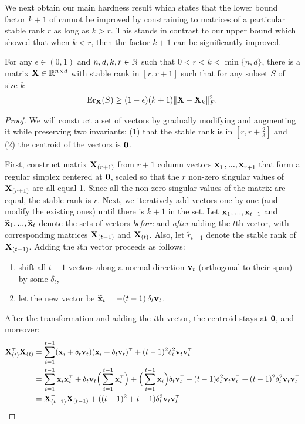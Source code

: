 \documentclass{article}
\begin{document}
We next obtain our main hardness result which states that the lower bound
factor $k+1$ of \cite{pca-volume-sampling} cannot be improved by constraining to matrices of a
particular stable rank $r$ as long as $k>r$. This stands in contrast
to our upper bound which showed that when $k<r$, then the factor $k+1$
can be significantly improved.
\begin{theorem}
	\label{t:lowerboundrleqk}
	For any $\epsilon\in(0,1)$ and $n,d,k,r\in\mathbb N$ such that  $0<r< k<\min\{n,d\}$, there is a matrix
	$\mathbf X\in\mathbb R^{n\times d}$ with stable rank in $[r,r+1]$ such that for any subset
	$S$ of size $k$
	\begin{align*}
	\mathrm{Er}_{\mathbf X}(S)\geq (1-\epsilon)(k+1) \|\mathbf X - \mathbf X_k \|_F^2.
	\end{align*}
\end{theorem}
\begin{proof}
	We will construct a set of vectors by gradually modifying and augmenting it while
	preserving two invariants: (1) that the stable rank is in $[r,r+\frac23]$
	and (2) the centroid of the vectors is  $\mathbf 0$. 
	
	First, construct matrix $\mathbf X_{(r+1)}$  from $r+1$ column vectors
	$\x_1^\top,...,\x_{r+1}^\top$ that form 
	a regular simplex centered at $\mathbf 0$, scaled so that the $r$ non-zero
	singular values of $\mathbf X_{(r+1)}$ are all equal 1. Since all the non-zero
	singular values of the matrix are equal, the stable rank
	is $r$. Next, we iteratively add vectors one by one (and modify the
	existing ones) until there is $k+1$ in the set. Let $\mathbf x_{1},...,\mathbf x_{t-1}$ and
	$\widetilde{\mathbf x}_1,...,\widetilde{\mathbf x}_t$ denote the 
	sets of vectors \emph{before} and \emph{after} adding the $t$th vector,
	with corresponding matrices $\mathbf X_{(t-1)}$ and $\mathbf X_{(t)}$. Also, let
	$\tilde r_{t-1}$ denote the stable rank of $\mathbf X_{(t-1)}$.
	Adding the $i$th vector proceeds as follows:
	\begin{enumerate}
		\item shift all $t-1$ vectors along a normal direction $\mathbf v_t$
		(orthogonal to their span) by some $\delta_t$,
		\item let the new vector be $\widetilde{\mathbf x}_{t}=- (t-1)\,\delta_t\mathbf v_t$.
	\end{enumerate}
	After the transformation and adding the $i$th vector, the centroid
	stays at $\mathbf 0$, and moreover:
	\begin{align*}
	\X_{(t)}^\top\X_{(t)} &=
	\sum_{i=1}^{t-1}(\x_i+\delta_t\v_t)(\x_i+\delta_t\v_t)^\top +
	(t-1)^2\delta_t^2\v_t\v_t^\top\\
	&=\sum_{i=1}^{t-1}\x_i\x_i^\top +
	\delta_t\v_t\Big(\sum_{i=1}^{t-1}\x_i^\top\Big) +
	\Big(\sum_{i=1}^{t-1}\x_i\Big)\delta_t\v_t^\top +
	(t-1)\delta_t^2\v_t\v_t^\top+        (t-1)^2\delta_t^2\v_t\v_t^\top\\
	&=\X_{(t-1)}^\top\X_{(t-1)}+((t-1)^2+t-1)\delta_t^2\v_t\v_t^\top.
	\end{align*}
	

\end{proof}
\end{document}

